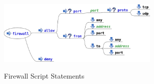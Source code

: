 \begin{figure}[htp]
\centering
\includegraphics[width=0.7\textwidth]{firewall_service_script}
\label{fig:firewall_script_statements}
\caption{Firewall Script Statements}
\end{figure}
